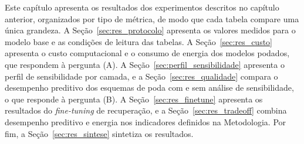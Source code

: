 Este capítulo apresenta os resultados dos experimentos descritos no capítulo anterior,
organizados por tipo de métrica, de modo que cada tabela
compare uma única grandeza. A Seção~\ref{sec:res_protocolo} apresenta os valores medidos para o
modelo base e as condições de leitura das tabelas. A Seção~\ref{sec:res_custo} apresenta o
custo computacional e o consumo de energia dos modelos podados, que respondem à pergunta (A). A
Seção~\ref{sec:perfil_sensibilidade} apresenta o perfil de sensibilidade por camada, e a
Seção~\ref{sec:res_qualidade} compara o desempenho preditivo dos esquemas de poda com e sem
análise de sensibilidade, o que responde à pergunta (B). A Seção~\ref{sec:res_finetune}
apresenta os resultados do \textit{fine-tuning} de recuperação, e a
Seção~\ref{sec:res_tradeoff} combina desempenho preditivo e energia nos indicadores definidos
na Metodologia. Por fim, a Seção~\ref{sec:res_sintese} sintetiza os
resultados.

